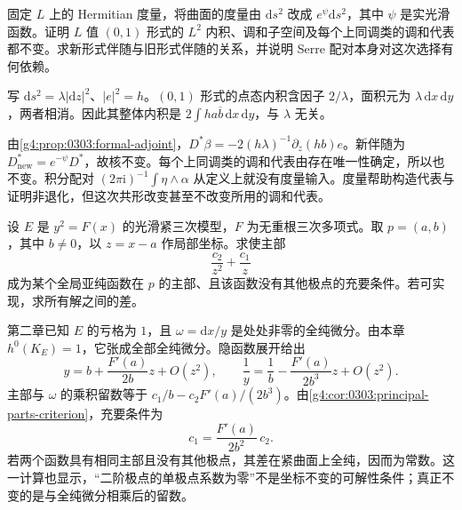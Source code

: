 \begin{exercise}
	\label{g4:ex:0303:conformal-metric}
	固定 \(L\) 上的 Hermitian 度量，将曲面的度量由 \(\mathrm{d}s^2\) 改成 \(e^\psi\mathrm{d}s^2\)，其中 \(\psi\) 是实光滑函数。证明 \(L\) 值 \((0,1)\) 形式的 \(L^2\) 内积、调和子空间及每个上同调类的调和代表都不变。求新形式伴随与旧形式伴随的关系，并说明 Serre 配对本身对这次选择有何依赖。
\end{exercise}
\begin{solution}
	写 \(\mathrm{d}s^2=\lambda|\mathrm{d}z|^2\)、\(|e|^2=h\)。\((0,1)\) 形式的点态内积含因子 \(2/\lambda\)，面积元为 \(\lambda\,\mathrm{d}x\,\mathrm{d}y\)，两者相消。因此其整体内积是 \(2\int h a\overline b\,\mathrm{d}x\,\mathrm{d}y\)，与 \(\lambda\) 无关。

	由\cref{g4:prop:0303:formal-adjoint}，\(D^*\beta=-2(h\lambda)^{-1}\partial_z(hb)e\)。新伴随为 \(D^*_{\mathrm{new}}=e^{-\psi}D^*\)，故核不变。每个上同调类的调和代表由存在唯一性确定，所以也不变。积分配对 \((2\pi\mathrm{i})^{-1}\int\eta\wedge\alpha\) 从定义上就没有度量输入。度量帮助构造代表与证明非退化，但这次共形改变甚至不改变所用的调和代表。
\end{solution}

\begin{exercise}
	\label{g4:ex:0303:cubic-principal-part}
	设 \(E\) 是 \(y^2=F(x)\) 的光滑紧三次模型，\(F\) 为无重根三次多项式。取 \(p=(a,b)\)，其中 \(b\ne0\)，以 \(z=x-a\) 作局部坐标。求使主部
	\[
		\frac{c_2}{z^2}+\frac{c_1}{z}
	\]
	成为某个全局亚纯函数在 \(p\) 的主部、且该函数没有其他极点的充要条件。若可实现，求所有解之间的差。
\end{exercise}
\begin{solution}
	第二章已知 \(E\) 的亏格为 \(1\)，且 \(\omega=\mathrm{d}x/y\) 是处处非零的全纯微分。由本章 \(h^0(K_E)=1\)，它张成全部全纯微分。隐函数展开给出
	\[
		y=b+\frac{F'(a)}{2b}z+O(z^2),\qquad
		\frac1y=\frac1b-\frac{F'(a)}{2b^3}z+O(z^2).
	\]
	主部与 \(\omega\) 的乘积留数等于 \(c_1/b-c_2F'(a)/(2b^3)\)。由\cref{g4:cor:0303:principal-parts-criterion}，充要条件为
	\[
		c_1=\frac{F'(a)}{2b^2}\,c_2.
	\]
	若两个函数具有相同主部且没有其他极点，其差在紧曲面上全纯，因而为常数。这一计算也显示，“二阶极点的单极点系数为零”不是坐标不变的可解性条件；真正不变的是与全纯微分相乘后的留数。
\end{solution}

